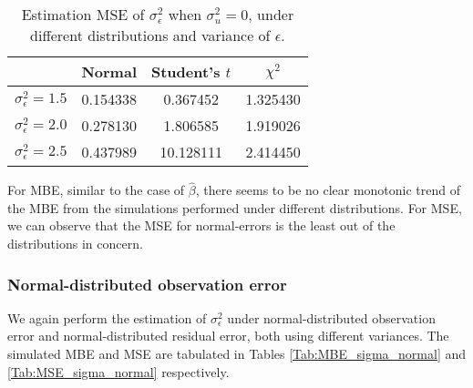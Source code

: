 \documentclass{article}
\begin{document}
\begin{table}[ht]
    \centering
    \caption{Estimation MSE of $\sigma^2_\epsilon$ when $\sigma^2_u=0$, under different distributions and variance of $\epsilon$.}
    \label{Tab:MSE_sigma_absence}
    \begin{tabular}[t]{lccc}
        \hline
        &Normal&Student's $t$&$\chi^2$\\
        \hline
        $\sigma^2_\epsilon = 1.5$&0.154338&0.367452&1.325430\\
        $\sigma^2_\epsilon = 2.0$&0.278130&1.806585&1.919026\\
        $\sigma^2_\epsilon = 2.5$&0.437989&10.128111&2.414450\\
        \hline
    \end{tabular}
\end{table}

For MBE, similar to the case of $\hat{\beta}$, there seems to be no clear monotonic trend of the MBE from the simulations performed under different distributions. 
For MSE, we can observe that the MSE for normal-errors is the least out of the distributions in concern.

\subsubsection{Normal-distributed observation error}

We again perform the estimation of $\sigma^2_\epsilon$ under normal-distributed observation error and normal-distributed residual error, both using different variances.
The simulated MBE and MSE are tabulated in Tables \ref{Tab:MBE_sigma_normal} and \ref{Tab:MSE_sigma_normal} respectively.
\end{document}

